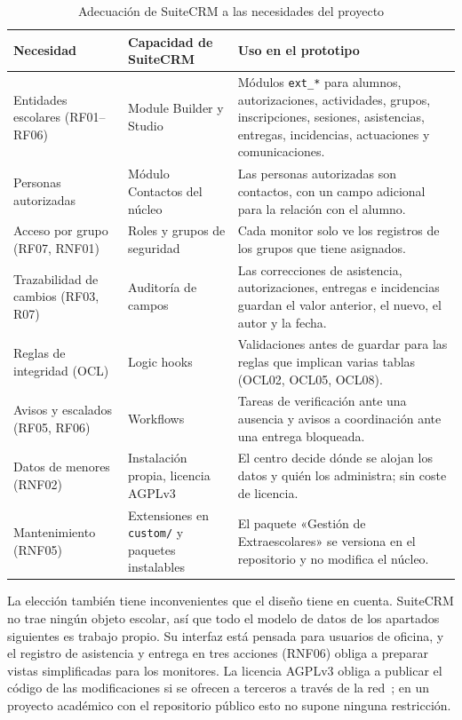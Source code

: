 \begin{table}[H]
\centering\footnotesize
\begin{tabularx}{\textwidth}{>{\hsize=0.85\hsize\raggedright\arraybackslash}X>{\hsize=1.05\hsize\raggedright\arraybackslash}X>{\hsize=1.10\hsize\raggedright\arraybackslash}X}
\toprule
\rowcolor{cabeceratabla} \textbf{Necesidad} & \textbf{Capacidad de SuiteCRM} & \textbf{Uso en el prototipo} \\
\midrule
Entidades escolares (RF01--RF06) & Module Builder y Studio~\cite{ref07} & Módulos \texttt{ext\_*} para alumnos, autorizaciones, actividades, grupos, inscripciones, sesiones, asistencias, entregas, incidencias, actuaciones y comunicaciones. \\
Personas autorizadas & Módulo Contactos del núcleo & Las personas autorizadas son contactos, con un campo adicional para la relación con el alumno. \\
Acceso por grupo (RF07, RNF01) & Roles y grupos de seguridad~\cite{ref08} & Cada monitor solo ve los registros de los grupos que tiene asignados. \\
Trazabilidad de cambios (RF03, R07) & Auditoría de campos & Las correcciones de asistencia, autorizaciones, entregas e incidencias guardan el valor anterior, el nuevo, el autor y la fecha. \\
Reglas de integridad (OCL) & Logic hooks~\cite{ref50} & Validaciones antes de guardar para las reglas que implican varias tablas (OCL02, OCL05, OCL08). \\
Avisos y escalados (RF05, RF06) & Workflows~\cite{ref09} & Tareas de verificación ante una ausencia y avisos a coordinación ante una entrega bloqueada. \\
Datos de menores (RNF02) & Instalación propia, licencia AGPLv3~\cite{ref06} & El centro decide dónde se alojan los datos y quién los administra; sin coste de licencia. \\
Mantenimiento (RNF05) & Extensiones en \texttt{custom/} y paquetes instalables & El paquete «Gestión de Extraescolares» se versiona en el repositorio y no modifica el núcleo. \\
\bottomrule
\end{tabularx}
\caption{Adecuación de SuiteCRM a las necesidades del proyecto}\label{tab:dis-adecuacion}
\end{table}

La elección también tiene inconvenientes que el diseño tiene en cuenta. SuiteCRM no trae ningún objeto escolar, así que todo el modelo de datos de los apartados siguientes es trabajo propio. Su interfaz está pensada para usuarios de oficina, y el registro de asistencia y entrega en tres acciones (RNF06) obliga a preparar vistas simplificadas para los monitores. La licencia AGPLv3 obliga a publicar el código de las modificaciones si se ofrecen a terceros a través de la red~\cite{ref06}; en un proyecto académico con el repositorio público esto no supone ninguna restricción.

